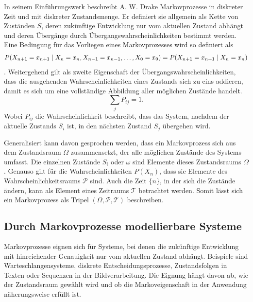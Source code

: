 In seinem Einführungswerk beschreibt A. W. Drake Markovprozesse in diskreter Zeit und mit diskreter Zustandsmenge. Er definiert sie allgemein als Kette von Zuständen $S$, deren zukünftige Entwicklung nur vom aktuellen Zustand abhängt und deren Übergänge durch Übergangswahrscheinlichkeiten bestimmt werden. Eine Bedingung für das Vorliegen eines Markovprozesses wird so definiert als \begin{equation}
P(X_{n+1} = x_{n+1} \mid X_n = x_n, X_{n-1} = x_{n-1}, \dots, X_0 = x_0)
= \\ P(X_{n+1} = x_{n+1} \mid X_n = x_n)
\label{eq:markov_property}
\end{equation}.
Weitergehend gilt als zweite Eigenschaft der Übergangswahrscheinlichkeiten, dass die ausgehenden Wahrscheinlichkeiten eines Zustands sich zu eins addieren, damit es sich um eine vollständige Abbildung aller möglichen Zustände handelt.
\begin{equation}
  \sum_j P_{ij} = 1.
\end{equation}
Wobei $P_{ij}$ die Wahrscheinlichkeit beschreibt, dass das System, nachdem der aktuelle Zustands $S_i$ ist, in den nächsten Zustand $S_j$ übergehen wird.\cite{drake88}

Generalisiert kann davon gesprochen werden, dass ein Markovprozess sich aus dem Zustandsraum $\Omega$ zusammensetzt, der alle möglichen Zustände des Systems umfasst. Die einzelnen Zustände $S_i$ oder $\omega$ sind Elemente dieses Zustandsraums $\Omega$. Genauso gilt für die Wahrscheinlichkeiten $P(X_{n})$, dass sie Elemente des Wahrscheinlichkeitsraums $\mathcal{P}$ sind. Auch die Zeit $\{n\}$, in der sich die Zustände ändern, kann als Element eines Zeitraums $\mathcal{T}$ betrachtet werden. Somit lässt sich ein Markovprozess als Tripel $(\Omega, \mathcal{P}, \mathcal{T})$ beschreiben.

\subsection{Durch Markovprozesse modellierbare Systeme}

Markovprozesse eignen sich für Systeme, bei denen die zukünftige Entwicklung mit hinreichender Genauigkeit nur vom aktuellen Zustand abhängt. Beispiele sind Warteschlangensysteme, diskrete Entscheidungsprozesse, Zustandsfolgen in Texten oder Sequenzen in der Bildverarbeitung. Die Eignung hängt davon ab, wie der Zustandsraum gewählt wird und ob die Markoveigenschaft in der Anwendung näherungsweise erfüllt ist.


